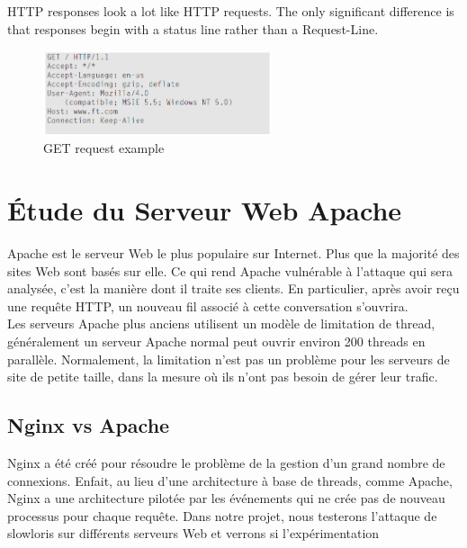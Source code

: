 \documentclass{article}
\begin{document}
\noindent
HTTP responses look a lot like HTTP requests. The only significant difference is that responses begin with a status line rather than a Request-Line.

\begin{figure}[H]
	\begin{center}
		\includegraphics[width=0.6\textwidth]{images/getRequest.png} %
		\caption{GET request example}
	\end{center}
\end{figure}

\section{Étude du Serveur Web Apache}
Apache est le serveur Web le plus populaire sur Internet. Plus que la majorité des sites Web sont basés sur elle. Ce qui rend Apache vulnérable à l'attaque qui sera analysée, c'est la manière dont il traite ses clients. En particulier, après avoir reçu une requête HTTP, un nouveau fil associé à cette conversation s'ouvrira. \\
Les serveurs Apache plus anciens utilisent un modèle de limitation de thread, généralement un serveur Apache normal peut ouvrir environ 200 threads en parallèle. Normalement, la limitation n’est pas un problème pour les serveurs de site de petite taille, dans la mesure où ils n’ont pas besoin de gérer leur trafic.

\subsection{Nginx vs Apache}
Nginx a été créé pour résoudre le problème de la gestion d’un grand nombre de connexions. Enfait, au lieu d’une architecture à base de threads, comme Apache, Nginx a une architecture pilotée par les événements qui ne crée pas de nouveau processus pour chaque requête. Dans notre projet, nous testerons l’attaque de slowloris sur différents serveurs Web et verrons si l’expérimentation

\end{document}
